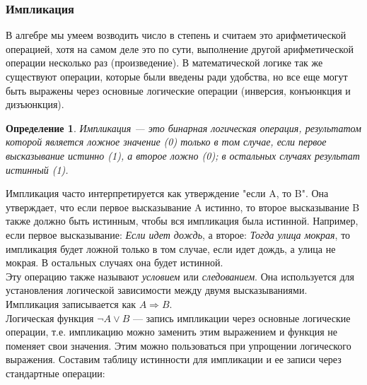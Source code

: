 \documentclass[12pt]{article}
\newtheorem{definition}{Определение}[section]
\theoremstyle{problem_style}
\begin{document}
\subsubsection{Импликация}
В алгебре мы умеем возводить число в степень и считаем это арифметической операцией, хотя на самом деле это по сути, выполнение другой арифметической операции несколько раз (произведение). В математической логике так же существуют операции, которые были введены ради удобства, но все еще могут быть выражены через основные логические операции (инверсия, конъюнкция и дизъюнкция).
\begin{definition}
Импликация — это бинарная логическая операция, результатом которой является ложное значение (0) только в том случае, если первое высказывание истинно (1), а второе ложно (0); в остальных случаях результат истинный (1).
\end{definition}
Импликация часто интерпретируется как утверждение "если A, то B". Она утверждает, что если первое высказывание A истинно, то второе высказывание B также должно быть истинным, чтобы вся импликация была истинной. Например, если первое высказывание: \textit{Если идет дождь}, а второе: \textit{Тогда улица мокрая}, то импликация будет ложной только в том случае, если идет дождь, а улица не мокрая. В остальных случаях она будет истинной.\\
Эту операцию также называют \textit{условием} или \textit{следованием}. Она используется для установления логической зависимости между двумя высказываниями. Импликация записывается как \(A \Rightarrow B\).\\
Логическая функция \(\lnot A \lor B\) — запись импликации через основные логические операции, т.е. импликацию можно заменить этим выражением и функция не поменяет свои значения. Этим можно пользоваться при упрощении логического выражения.
\newpage
Составим таблицу истинности для импликации и ее записи через стандартные операции:
\end{document}
